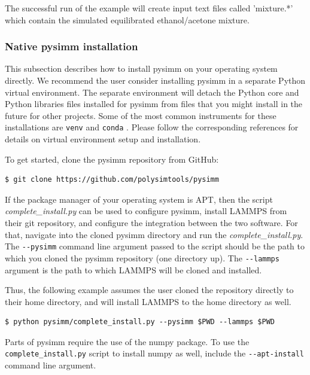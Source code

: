 \documentclass[9pt,tutorial]{livecoms}
\begin{document}
The successful run of the example will create input text files called 'mixture.*' which contain the simulated equilibrated ethanol/acetone mixture.


\subsubsection{Native pysimm installation}

This subsection describes how to install pysimm on your operating system directly. We recommend the user consider installing pysimm in a separate Python virtual environment. The separate environment will detach the Python core and Python libraries files installed for pysimm from files that you might install in the future for other projects. Some of the most common instruments for these installations are \lstinline$venv$ \cite{venv_py} and \lstinline$conda$ \cite{conda}. Please follow the corresponding references for details on virtual environment setup and installation.

To get started, clone the pysimm repository from GitHub:

\begin{lstlisting}
$ git clone https://github.com/polysimtools/pysimm
\end{lstlisting}

If the package manager of your operating system is APT, then the script \textit{complete\_install.py} can be used to configure pysimm, install LAMMPS from their git repository, and configure the integration between the two software. For that, navigate into the cloned pysimm directory and run the \textit{complete\_install.py}. The \lstinline$--pysimm$ command line argument passed to the script should be the path to which you cloned the pysimm repository (one directory up). The \lstinline$--lammps$ argument is the path to which LAMMPS will be cloned and installed.  

Thus, the following example assumes the user cloned the repository directly to their home directory, and will install LAMMPS to the home directory as well.

\begin{lstlisting}
$ python pysimm/complete_install.py --pysimm $PWD --lammps $PWD 
\end{lstlisting}

Parts of pysimm require the use of the numpy package. To use the \lstinline$complete_install.py$ script to install numpy as well, include the \lstinline$--apt-install$ command line argument.
\end{document}
